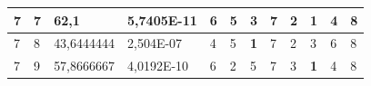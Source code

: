 \documentclass[conference]{IEEEtran}
\begin{document}
\begin{table}[]
\begin{tabular}{|llll|llllllll|}
\multicolumn{1}{|l|}{7}                                                     & \multicolumn{1}{l|}{7}                                                        & \multicolumn{1}{l|}{62,1}                                                         & 5,7405E-11                     & \multicolumn{1}{l|}{6}                                                  & \multicolumn{1}{l|}{5}                                                  & \multicolumn{1}{l|}{3}                                                  & \multicolumn{1}{l|}{7}                                                  & \multicolumn{1}{l|}{2}                                                  & \multicolumn{1}{l|}{\textbf{1}}                                         & \multicolumn{1}{l|}{4}                                                  & 8                          \\ \hline
\multicolumn{1}{|l|}{7}                                                     & \multicolumn{1}{l|}{8}                                                        & \multicolumn{1}{l|}{43,6444444}                                                   & 2,504E-07                      & \multicolumn{1}{l|}{4}                                                  & \multicolumn{1}{l|}{5}                                                  & \multicolumn{1}{l|}{\textbf{1}}                                         & \multicolumn{1}{l|}{7}                                                  & \multicolumn{1}{l|}{2}                                                  & \multicolumn{1}{l|}{3}                                                  & \multicolumn{1}{l|}{6}                                                  & 8                          \\ \hline
\multicolumn{1}{|l|}{7}                                                     & \multicolumn{1}{l|}{9}                                                        & \multicolumn{1}{l|}{57,8666667}                                                   & 4,0192E-10                     & \multicolumn{1}{l|}{6}                                                  & \multicolumn{1}{l|}{2}                                                  & \multicolumn{1}{l|}{5}                                                  & \multicolumn{1}{l|}{7}                                                  & \multicolumn{1}{l|}{3}                                                  & \multicolumn{1}{l|}{\textbf{1}}                                         & \multicolumn{1}{l|}{4}                                                  & 8                          \\ \hline

\end{tabular}
\end{table}
\end{document}
